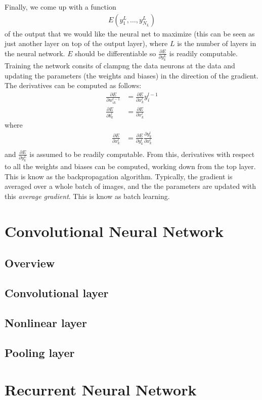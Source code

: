 Finally, we come up with a function 
\begin{align*}
	E\left(y^L_1, \dots, y^L_{N_L}\right)
\end{align*}
of the output that we would like the neural net to maximize (this can be seen as just another layer on top of the output layer), where $L$ is the number of layers in the neural network. $E$ should be differentiable so $\displaystyle\frac{\partial E}{ \partial y^L_k}$ is readily computable. Training the network consits of clampng the data neurons at the data and updating the parameters (the weights and biases) in the direction of the gradient. The derivatives can be computed as follows:
\begin{align*}
\frac{\partial E}{\partial w_{ik}^{l-1}} &= \frac{\partial E}{\partial x^l_k}y^{l-1}_i\\
\frac{\partial E}{\partial b^l_k} &= \frac{\partial E}{\partial x^l_k} 
\end{align*}
where
\begin{align*}
\frac{\partial E}{\partial x^l_k} &= \frac{\partial E}{\partial y^l_k} \frac{\partial y^l_k}{\partial x^l_k}\\
\end{align*}
and $\displaystyle\frac{\partial E}{\partial y^L_k}$ is assumed to be readily computable. From this, derivatives with respect to all the weights and biases can be computed, working down from the top layer. This is know as the backpropagation algorithm. Typically, the gradient is averaged over a whole batch of images, and the the parameters are updated with this \textit{average gradient}. This is know as batch learning.

\section{Convolutional Neural Network}
\subsection{Overview}

\subsection{Convolutional layer}

\subsection{Nonlinear layer}

\subsection{Pooling layer}

\section{Recurrent Neural Network}